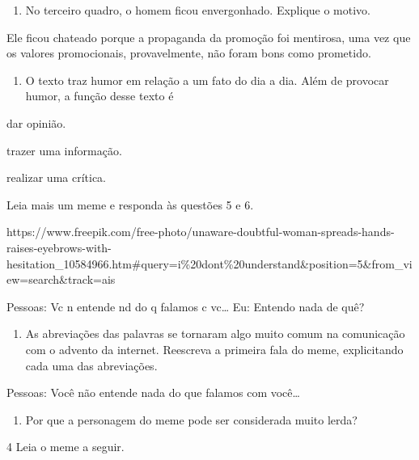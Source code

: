 \begin{itemize}
\begin{itemize}
\begin{enumerate}
\def\labelenumi{\arabic{enumi}.}
\setcounter{enumi}{2}
\tightlist
\item
  No terceiro quadro, o homem ficou envergonhado. Explique o motivo.
\end{enumerate}


Ele ficou chateado porque a propaganda da promoção foi mentirosa, uma
vez que os valores promocionais, provavelmente, não foram bons como
prometido.

\begin{enumerate}
\def\labelenumi{\arabic{enumi}.}
\setcounter{enumi}{3}
\tightlist
\item
  O texto traz humor em relação a um fato do dia a dia. Além de provocar
  humor, a função desse texto é
\end{enumerate}

 dar opinião.

 trazer uma informação.

 realizar uma crítica.

Leia mais um meme e responda às questões 5 e 6.

https://www.freepik.com/free-photo/unaware-doubtful-woman-spreads-hands-raises-eyebrows-with-hesitation\_10584966.htm\#query=i\%20dont\%20understand\&position=5\&from\_view=search\&track=ais

Pessoas: Vc n entende nd do q falamos c vc\ldots{} Eu: Entendo nada de
quê?

\begin{enumerate}
\def\labelenumi{\arabic{enumi}.}
\setcounter{enumi}{4}
\tightlist
\item
  As abreviações das palavras se tornaram algo muito comum na
  comunicação com o advento da internet. Reescreva a primeira fala do
  meme, explicitando cada uma das abreviações.
\end{enumerate}


Pessoas: Você não entende nada do que falamos com você\ldots{}

\begin{enumerate}
\def\labelenumi{\arabic{enumi}.}
\setcounter{enumi}{5}
\tightlist
\item
  Por que a personagem do meme pode ser considerada muito lerda?
\end{enumerate}

\num{4} Leia o meme a seguir.


\end{itemize}
\end{itemize}
